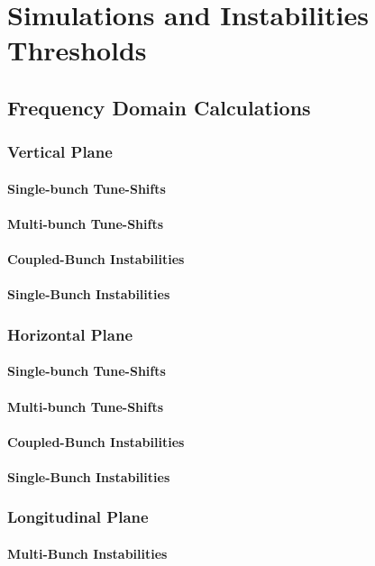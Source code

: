 \chapter{Simulations and Instabilities Thresholds}
\section{Frequency Domain Calculations}
\subsection{Vertical Plane}
\subsubsection{Single-bunch Tune-Shifts}
\subsubsection{Multi-bunch Tune-Shifts}
\subsubsection{Coupled-Bunch Instabilities}
\subsubsection{Single-Bunch Instabilities}
\subsection{Horizontal Plane}
\subsubsection{Single-bunch Tune-Shifts}
\subsubsection{Multi-bunch Tune-Shifts}
\subsubsection{Coupled-Bunch Instabilities}
\subsubsection{Single-Bunch Instabilities}
\subsection{Longitudinal Plane}
\subsubsection{Multi-Bunch Instabilities}
